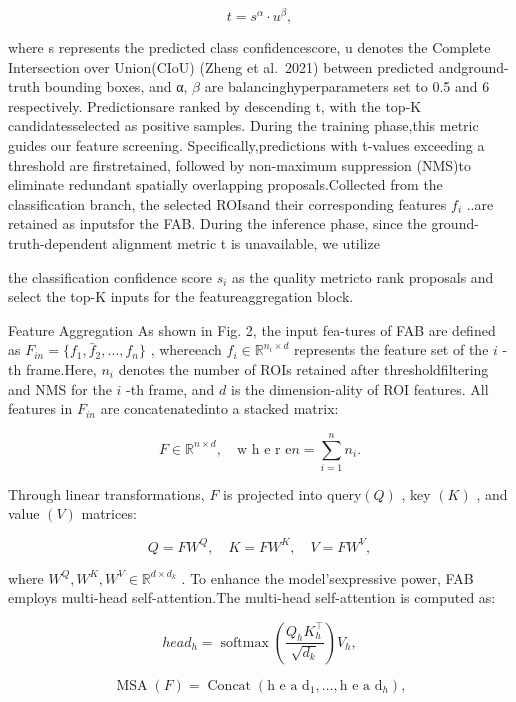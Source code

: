 \documentclass[
  10
]{article}
\begin{document}
\[
t = s ^ {\alpha} \cdot u ^ {\beta}, \tag {1}
\]

where s represents the predicted class confidencescore, u denotes the
Complete Intersection over Union(CIoU) (Zheng et al.~2021) between
predicted andground-truth bounding boxes, and α, \(\beta\) are
balancinghyperparameters set to 0.5 and 6 respectively. Predictionsare
ranked by descending t, with the top-K candidatesselected as positive
samples. During the training phase,this metric guides our feature
screening. Specifically,predictions with t-values exceeding a threshold
are firstretained, followed by non-maximum suppression (NMS)to eliminate
redundant spatially overlapping proposals.Collected from the
classification branch, the selected ROIsand their corresponding features
\(f _ { i }\) ..are retained as inputsfor the FAB. During the inference
phase, since the ground-truth-dependent alignment metric t is
unavailable, we utilize

the classification confidence score \(s _ { i }\) as the quality
metricto rank proposals and select the top-K inputs for the
featureaggregation block.

Feature Aggregation As shown in Fig. 2, the input fea-tures of FAB are
defined as
\(F _ { i n } = \{ f _ { 1 } , { \bar { f } } _ { 2 } , \dots , f _ { n } \}\)
, whereeach \(f _ { i } \in \mathbb { R } ^ { n _ { i } \times d }\)
represents the feature set of the \(i\) -th frame.Here, \(n _ { i }\)
denotes the number of ROIs retained after thresholdfiltering and NMS for
the \(i\) -th frame, and \(d\) is the dimension-ality of ROI features.
All features in \(F _ { i n }\) are concatenatedinto a stacked matrix:

\[
F \in \mathbb {R} ^ {n \times d}, \quad \text {w h e r e} n = \sum_ {i = 1} ^ {n} n _ {i}. \tag {2}
\]

Through linear transformations, \(F\) is projected into query\(( Q )\) ,
key \(( K )\) , and value \(( V )\) matrices:

\[
Q = F W ^ {Q}, \quad K = F W ^ {K}, \quad V = F W ^ {V}, \tag {3}
\]

where
\(W ^ { Q } , W ^ { K } , W ^ { V } \in \mathbb { R } ^ { d \times d _ { k } }\)
. To enhance the model'sexpressive power, FAB employs multi-head
self-attention.The multi-head self-attention is computed as:

\[
h e a d _ {h} = \operatorname {s o f t m a x} \left(\frac {Q _ {h} K _ {h} ^ {\top}}{\sqrt {d _ {k}}}\right) V _ {h}, \tag {4}
\]

\[
\operatorname {M S A} (F) = \operatorname {C o n c a t} \left(\text {h e a d} _ {1}, \dots , \text {h e a d} _ {h}\right), \tag {5}
\]
\end{document}
